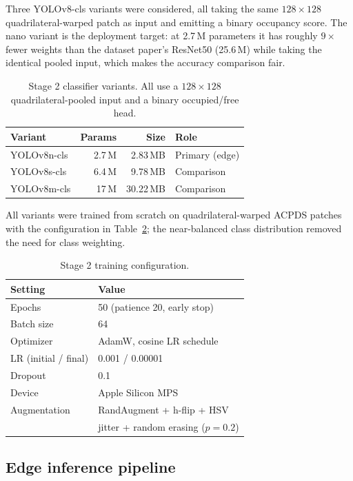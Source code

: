 \documentclass[10pt,twocolumn,letterpaper]{article}
\begin{document}
Three YOLOv8-cls variants were considered, all taking the same
$128\times128$ quadrilateral-warped patch as input and emitting a binary
occupancy score. The nano variant is the deployment target: at 2.7\,M
parameters it has roughly $9\times$ fewer weights than the dataset paper's
ResNet50 (25.6\,M) while taking the identical pooled input, which makes the
accuracy comparison fair.

\begin{table}[t]
\centering\small
\setlength{\tabcolsep}{4pt}
\begin{tabular}{lrrl}
\toprule
\textbf{Variant} & \textbf{Params} & \textbf{Size} & \textbf{Role} \\
\midrule
YOLOv8n-cls & 2.7\,M & 2.83\,MB & Primary (edge) \\
YOLOv8s-cls & 6.4\,M & 9.78\,MB & Comparison \\
YOLOv8m-cls & 17\,M & 30.22\,MB & Comparison \\
\bottomrule
\end{tabular}
\caption{Stage 2 classifier variants. All use a $128\times128$
quadrilateral-pooled input and a binary occupied/free head.}
\label{tab:variants}
\end{table}

All variants were trained from scratch on quadrilateral-warped ACPDS
patches with the configuration in Table~\ref{tab:trainconfig}; the
near-balanced class distribution removed the need for class weighting.

\begin{table}[H]
\centering\small
\begin{tabular}{ll}
\toprule
\textbf{Setting} & \textbf{Value} \\
\midrule
Epochs & 50 (patience 20, early stop) \\
Batch size & 64 \\
Optimizer & AdamW, cosine LR schedule \\
LR (initial / final) & 0.001 / 0.00001 \\
Dropout & 0.1 \\
Device & Apple Silicon MPS \\
Augmentation & RandAugment + h-flip + HSV \\
 & jitter + random erasing ($p{=}0.2$) \\
\bottomrule
\end{tabular}
\caption{Stage 2 training configuration.}
\label{tab:trainconfig}
\end{table}

\subsection{Edge inference pipeline}
\label{sec:edge}
\end{document}
